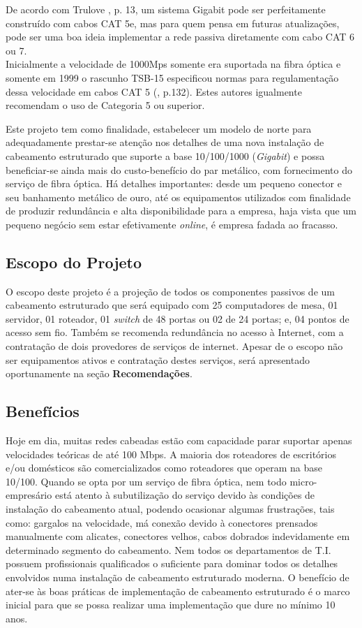 \documentclass[	DIV=calc,%
							paper=a4,%
							fontsize=12pt,%
							onecolumn]{scrartcl}	 					%
\begin{document}
De acordo com Trulove \cite{trulove2006lan}, p. 13, um sistema Gigabit pode ser perfeitamente construído com cabos CAT 5e, mas para quem pensa em futuras atualizações, pode ser uma boa ideia implementar a rede passiva diretamente com cabo CAT 6 ou 7.
\\

Inicialmente a velocidade de 1000Mps somente era suportada na fibra óptica e somente em 1999 o rascunho TSB-15 especificou normas para regulamentação dessa velocidade em cabos CAT 5 (\cite{barnett2006cabling}, p.132). Estes autores igualmente recomendam o uso de Categoria 5 ou superior.

Este projeto tem como finalidade, estabelecer um modelo de norte para adequadamente prestar-se atenção nos detalhes de uma nova instalação de cabeamento estruturado que suporte a base 10/100/1000 (\textit{Gigabit}) e possa beneficiar-se ainda mais do custo-benefício do par metálico, com fornecimento do serviço de fibra óptica. Há detalhes importantes: desde um pequeno conector e seu banhamento metálico de ouro, até os equipamentos utilizados com finalidade de produzir redundância e alta disponibilidade para a empresa, haja vista que um pequeno negócio sem estar efetivamente \textit{online}, é empresa fadada ao fracasso.
\bigskip

\subsection{Escopo do Projeto}
O escopo deste projeto é a projeção de todos os componentes passivos de um cabeamento estruturado que será equipado com 25 computadores de mesa, 01 servidor, 01 roteador, 01 \textit{switch} de 48 portas ou 02 de 24 portas; e, 04 pontos de acesso sem fio. Também se recomenda redundância no acesso à Internet, com a contratação de dois provedores de serviços de internet. Apesar de o escopo não ser equipamentos ativos e contratação destes serviços, será apresentado oportunamente na seção \textbf{Recomendações}.

\subsection{Benefícios}
Hoje em dia, muitas redes cabeadas estão com capacidade parar suportar apenas velocidades teóricas de até 100 Mbps. A maioria dos roteadores de escritórios e/ou domésticos são comercializados como roteadores que operam na base 10/100. Quando se opta por um serviço de fibra óptica, nem todo micro-empresário está atento à subutilização do serviço devido às condições de instalação do cabeamento atual, podendo ocasionar algumas frustrações, tais como: gargalos na velocidade, má conexão devido à conectores prensados manualmente com alicates, conectores velhos, cabos dobrados indevidamente em determinado segmento do cabeamento. Nem todos os departamentos de T.I. possuem profissionais qualificados o suficiente para dominar todos os detalhes envolvidos numa instalação de cabeamento estruturado moderna. O benefício de ater-se às boas práticas de implementação de cabeamento estruturado é o marco inicial para que se possa realizar uma implementação que dure no mínimo 10 anos.
\end{document}
